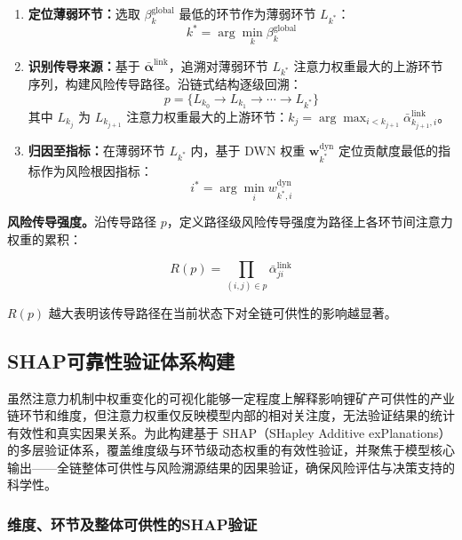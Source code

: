 \begin{enumerate}
\item \textbf{定位薄弱环节：}选取 $\beta_k^{\text{global}}$ 最低的环节作为薄弱环节 $L_{k^*}$：
\begin{equation}
k^* = \arg\min_k \beta_k^{\text{global}}
\end{equation}

\item \textbf{识别传导来源：}基于 $\bar{\boldsymbol{\alpha}}^{\text{link}}$，追溯对薄弱环节 $L_{k^*}$ 注意力权重最大的上游环节序列，构建风险传导路径。沿链式结构逐级回溯：
\begin{equation}
p = \{L_{k_0} \to L_{k_1} \to \cdots \to L_{k^*}\}
\end{equation}
其中 $L_{k_j}$ 为 $L_{k_{j+1}}$ 注意力权重最大的上游环节：$k_{j}=\arg\max_{i<k_{j+1}} \bar{\alpha}_{k_{j+1},i}^{\text{link}}$。

\item \textbf{归因至指标：}在薄弱环节 $L_{k^*}$ 内，基于 DWN 权重 $\mathbf{w}_{k^*}^{\text{dyn}}$ 定位贡献度最低的指标作为风险根因指标：
\begin{equation}
i^* = \arg\min_i w_{k^*,i}^{\text{dyn}}
\end{equation}
\end{enumerate}

\textbf{风险传导强度。}沿传导路径 $p$，定义路径级风险传导强度为路径上各环节间注意力权重的累积：

\begin{equation}
R(p) = \prod_{(i,j)\in p} \bar{\alpha}_{ji}^{\text{link}}
\end{equation}

$R(p)$ 越大表明该传导路径在当前状态下对全链可供性的影响越显著。

\subsection{SHAP可靠性验证体系构建}

虽然注意力机制中权重变化的可视化能够一定程度上解释影响锂矿产可供性的产业链环节和维度，但注意力权重仅反映模型内部的相对关注度，无法验证结果的统计有效性和真实因果关系。为此构建基于 SHAP（SHapley Additive exPlanations）的多层验证体系，覆盖维度级与环节级动态权重的有效性验证，并聚焦于模型核心输出——全链整体可供性与风险溯源结果的因果验证，确保风险评估与决策支持的科学性。

\subsubsection{维度、环节及整体可供性的SHAP验证}

